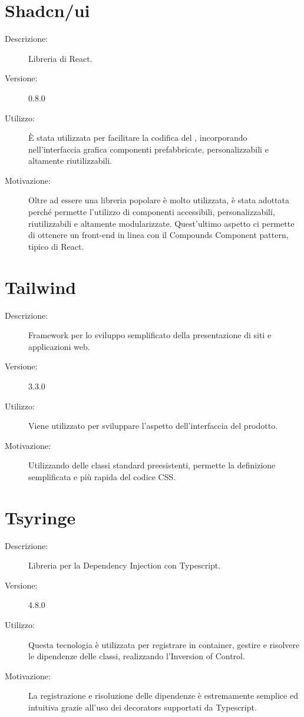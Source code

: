 \section{Shadcn/ui}
\begin{description}
\item[Descrizione:] Libreria di  React.
\item[Versione:] 0.8.0
\item[Utilizzo:] È stata utilizzata per facilitare la codifica del , incorporando nell'interfaccia grafica componenti prefabbricate, personalizzabili e altamente riutilizzabili.
\item[Motivazione:] Oltre ad essere una libreria popolare è molto utilizzata, è stata adottata perché permette l'utilizzo di componenti accessibili, personalizzabili, riutilizzabili e altamente modularizzate. Quest'ultimo aspetto ci permette di ottenere un front-end in linea con il Compounds Component pattern, tipico di React.
\end{description}

\section{Tailwind}
\begin{description}
\item[Descrizione:] Framework  per lo sviluppo semplificato della presentazione di siti e applicazioni web.
\item[Versione:] 3.3.0
\item[Utilizzo:] Viene utilizzato per sviluppare l'aspetto dell'interfaccia del prodotto.
\item[Motivazione:] Utilizzando delle classi standard preesistenti, permette la definizione semplificata e più rapida del codice CSS.
\end{description}

\section{Tsyringe}
\begin{description}
\item[Descrizione:] Libreria per la Dependency Injection con Typescript.
\item[Versione:] 4.8.0
\item[Utilizzo:] Questa tecnologia è utilizzata per registrare in container, gestire e risolvere le dipendenze delle classi, realizzando l'Inversion of Control.
\item[Motivazione:] La registrazione e risoluzione delle dipendenze è estremamente semplice ed intuitiva grazie all'uso dei decorators supportati da Typescript.
\end{description}

